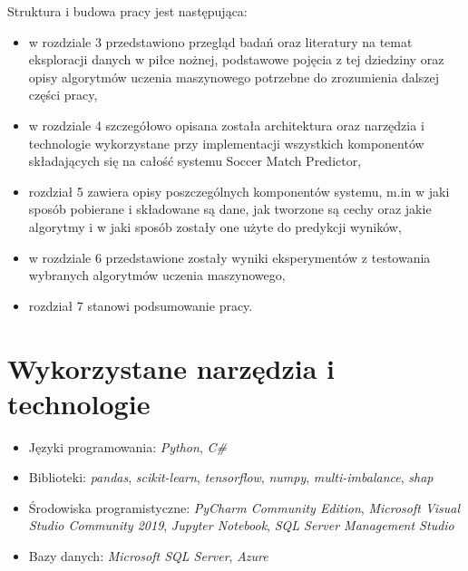 \noindent Struktura i budowa pracy jest następująca:
\begin{itemize}
    \item w rozdziale 3 przedstawiono przegląd badań oraz literatury na temat eksploracji danych w piłce nożnej, podstawowe pojęcia z tej dziedziny oraz opisy algorytmów uczenia maszynowego potrzebne do zrozumienia dalszej części pracy,
    \item w rozdziale 4 szczegółowo opisana została architektura oraz narzędzia i technologie wykorzystane przy implementacji wszystkich komponentów składających się na całość systemu Soccer Match Predictor,
    \item rozdział 5 zawiera opisy poszczególnych komponentów systemu, m.in w jaki sposób pobierane i składowane są dane, jak tworzone są cechy oraz jakie algorytmy i w jaki sposób zostały one użyte do predykcji wyników,
    \item w rozdziale 6 przedstawione zostały wyniki eksperymentów z testowania wybranych algorytmów uczenia maszynowego,
    \item rozdział 7 stanowi podsumowanie pracy.
\end{itemize}

\section{Wykorzystane narzędzia i technologie}
\begin{itemize}
    \item Języki programowania: \textit{Python}, \textit{C\#}
    \item Biblioteki: \textit{pandas}, \textit{scikit-learn}, \textit{tensorflow}, \textit{numpy}, \textit{multi-imbalance}, \textit{shap}
    \item Środowiska programistyczne: \textit{PyCharm Community Edition}, \textit{Microsoft Visual Studio Community 2019}, \textit{Jupyter Notebook}, \textit{SQL Server Management Studio}
    \item Bazy danych: \textit{Microsoft SQL Server}, \textit{Azure}
\end{itemize}
